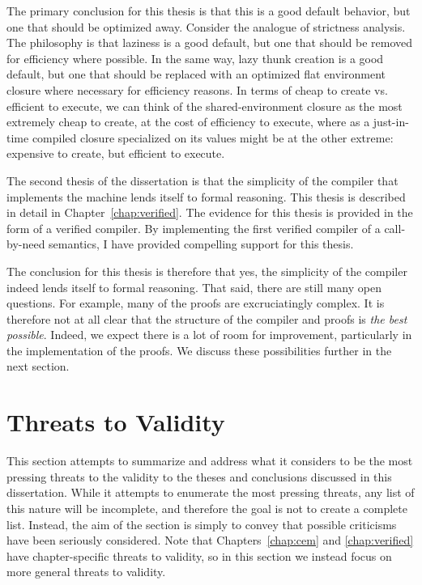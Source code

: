 The primary conclusion for this thesis is that this is a good default behavior,
but one that should be optimized away. Consider the analogue of strictness
analysis. The philosophy is that laziness is a good default, but one that should
be removed for efficiency where possible. In the same way, lazy thunk creation
is a good default, but one that should be replaced with an optimized flat
environment closure where necessary for efficiency reasons. In terms of cheap to
create vs. efficient to execute, we can think of the shared-environment closure
as the most extremely cheap to create, at the cost of efficiency to execute,
where as a just-in-time compiled closure specialized on its values might be at
the other extreme: expensive to create, but efficient to execute. 

The second thesis of the dissertation is that the simplicity of the compiler
that implements the \ce machine lends itself to formal reasoning. This thesis is
described in detail in Chapter~\ref{chap:verified}. The evidence for this thesis
is provided in the form of a verified compiler. By implementing the first
verified compiler of a call-by-need semantics, I have provided compelling
support for this thesis. 

The conclusion for this thesis is therefore that yes, the simplicity of the
compiler indeed lends itself to formal reasoning. That said, there are still
many open questions. For example, many of the proofs are excruciatingly complex.
It is therefore not at all clear that the structure of the compiler and proofs
is \emph{the best possible}. Indeed, we expect there is a lot of room for
improvement, particularly in the implementation of the proofs. We discuss these
possibilities further in the next section. 

\section{Threats to Validity}

This section attempts to summarize and address what it considers to be the most
pressing threats to the validity to the theses and conclusions discussed in this
dissertation. While it attempts to enumerate the most pressing threats, any list
of this nature will be incomplete, and therefore the goal is not to create a
complete list. Instead, the aim of the section is simply to convey that possible
criticisms have been seriously considered. Note that Chapters~\ref{chap:cem} and
\ref{chap:verified} have chapter-specific threats to validity, so in this
section we instead focus on more general threats to validity. 

